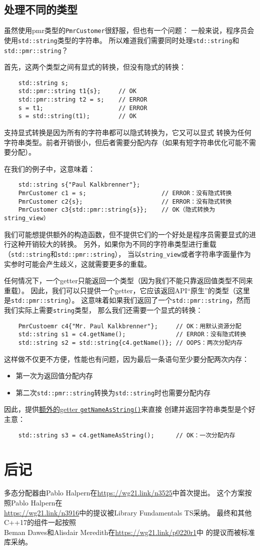 \subsection{处理不同的类型}
虽然使用pmr类型的\texttt{PmrCustomer}很舒服，但也有一个问题：
一般来说，程序员会使用\texttt{std::string}类型的字符串。
所以难道我们需要同时处理\texttt{std::string}和\texttt{std::pmr::string}？

首先，这两个类型之间有显式的转换，但没有隐式的转换：
\begin{lstlisting}
    std::string s;
    std::pmr::string t1{s};     // OK
    std::pmr::string t2 = s;    // ERROR
    s = t1;                     // ERROR
    s = std::string(t1);        // OK
\end{lstlisting}
支持显式转换是因为所有的字符串都可以隐式转换为，它又可以显式
转换为任何字符串类型。前者开销很小，但后者需要分配内存（如果有短字符串优化可能不需要分配）。

在我们的例子中，这意味着：
\begin{lstlisting}
    std::string s{"Paul Kalkbrenner"};
    PmrCustomer c1 = s;                     // ERROR：没有隐式转换
    PmrCustomer c2{s};                      // ERROR：没有隐式转换
    PmrCustomer c3{std::pmr::string{s}};    // OK（隐式转换为string_view）
\end{lstlisting}
我们可能想提供额外的构造函数，但不提供它们的一个好处是程序员需要显式的进行这种开销较大的转换。
另外，如果你为不同的字符串类型进行重载（\texttt{std::string}和\texttt{std::pmr::string}），
当以\texttt{string\_view}或者字符串字面量作为实参时可能会产生歧义，这就需要更多的重载。

任何情况下，一个getter只能返回一个类型（因为我们不能只靠返回值类型不同来重载）。
因此，我们可以只提供一个getter，它应该返回API“原生”的类型（这里是\texttt{std::pmr::string}）。
这意味着如果我们返回了一个\texttt{std::pmr::string}，然而我们实际上需要\texttt{string}类型，
那么我们还需要一个显式的转换：\label{pmr转换}
\begin{lstlisting}
    PmrCustoemr c4{"Mr. Paul Kalkbrenner"};     // OK：用默认资源分配
    std::string s1 = c4.getName();              // ERROR：没有隐式转换
    std::string s2 = std::string{c4.getName()}; // OOPS：两次分配内存
\end{lstlisting}
这样做不仅更不方便，性能也有问题，因为最后一条语句至少要分配两次内存：
\begin{itemize}
    \item 第一次为返回值分配内存
    \item 第二次\texttt{std::pmr::string}转换为\texttt{std::string}时也需要分配内存
\end{itemize}
因此，提供\hyperref[ch29.3.1]{额外的getter \texttt{getNameAsString()}}来直接
创建并返回字符串类型是个好主意：
\begin{lstlisting}
    std::string s3 = c4.getNameAsString();      // OK：一次分配内存
\end{lstlisting}

\section{后记}
多态分配器由Pablo Halpern在\url{https://wg21.link/n3525}中首次提出。
这个方案按照Pablo Halpern在\\
\url{https://wg21.link/n3916}中的提议被Library Fundamentals TS采纳。
最终和其他C++17的组件一起按照\\
Beman Dawes和Alisdair Meredith在\url{https://wg21.link/p0220r1}中
的提议而被标准库采纳。


